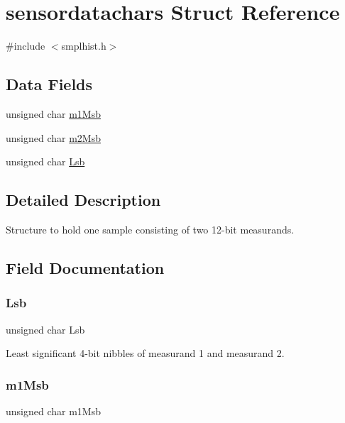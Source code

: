 \hypertarget{structsensordatachars}{}\section{sensordatachars Struct Reference}
\label{structsensordatachars}


{\ttfamily \#include $<$smplhist.\+h$>$}

\subsection*{Data Fields}
\begin{DoxyCompactItemize}
\item 
unsigned char \mbox{\hyperlink{structsensordatachars_a978b1d72dd059ccd2323ee66bea4d654}{m1\+Msb}}
\item 
unsigned char \mbox{\hyperlink{structsensordatachars_a030c938f5a438a3556f1887dfe72466f}{m2\+Msb}}
\item 
unsigned char \mbox{\hyperlink{structsensordatachars_afbfc01b26f853a9c35003e1c065db84f}{Lsb}}
\end{DoxyCompactItemize}


\subsection{Detailed Description}
Structure to hold one sample consisting of two 12-\/bit measurands. 

\subsection{Field Documentation}
\mbox{\label{structsensordatachars_afbfc01b26f853a9c35003e1c065db84f}} 
\subsubsection{\texorpdfstring{Lsb}{Lsb}}
{\footnotesize\ttfamily unsigned char Lsb}

Least significant 4-\/bit nibbles of measurand 1 and measurand 2. \mbox{\label{structsensordatachars_a978b1d72dd059ccd2323ee66bea4d654}} 
\subsubsection{\texorpdfstring{m1\+Msb}{m1Msb}}
{\footnotesize\ttfamily unsigned char m1\+Msb}

